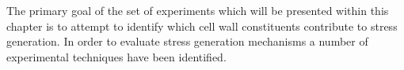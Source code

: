 The primary goal of the set of experiments which will be presented within this
chapter is to attempt to identify which cell wall constituents contribute to
stress generation. In order to evaluate stress generation mechanisms a number of
experimental techniques have been identified.